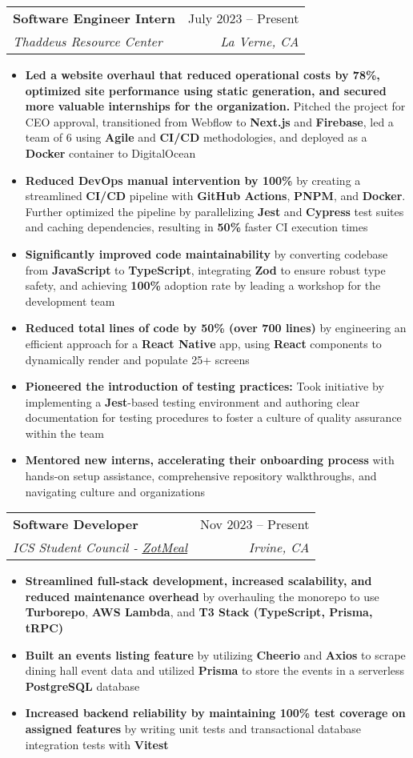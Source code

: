 \documentclass[letterpaper,11pt]{article}
\makeatletter
\newcommand{\resumeItem}[1]{
  \item\setstretch{.95}\small{
    {#1 \vspace{-2pt}}
  }
}
\newcommand{\resumeSubheading}[4]{
  \vspace{-2pt}\item
    \begin{tabular*}{0.97\textwidth}[t]{l@{\extracolsep{\fill}}r}
      \textbf{#1} & #2 \\
      \textit{\small#3} & \textit{\small #4} \\
    \end{tabular*}\vspace{-4.8pt}
}
\newcommand{\resumeItemListStart}{\begin{itemize}}
\newcommand{\resumeItemListEnd}{\end{itemize}\vspace{-5pt}}
\makeatother
\begin{document}
    \resumeSubheading
      {Software Engineer Intern}{July 2023 -- Present}
      {Thaddeus Resource Center}{La Verne, CA}
      \resumeItemListStart
        \resumeItem{\textbf{Led a website overhaul that reduced operational costs by 78\%, optimized site performance using static generation, and secured more valuable internships for the organization.} Pitched the project for CEO approval, transitioned from Webflow to \textbf{Next.js} and \textbf{Firebase}, led a team of 6 using \textbf{Agile} and \textbf{CI/CD} methodologies, and deployed as a \textbf{Docker} container to DigitalOcean}
        \resumeItem{\textbf{Reduced DevOps manual intervention by 100\%} by creating a streamlined \textbf{CI/CD} pipeline with \textbf{GitHub Actions}, \textbf{PNPM}, and \textbf{Docker}. Further optimized the pipeline by parallelizing \textbf{Jest} and \textbf{Cypress} test suites and caching dependencies, resulting in \textbf{50\%} faster CI execution times}
        \resumeItem{\textbf{Significantly improved code maintainability} by converting codebase from \textbf{JavaScript} to \textbf{TypeScript}, integrating \textbf{Zod} to ensure robust type safety, and achieving \textbf{100\%} adoption rate by leading a workshop for the development team}
        \resumeItem{\textbf{Reduced total lines of code by 50\% (over 700 lines)} by engineering an efficient approach for a \textbf{React Native} app, using \textbf{React} components to dynamically render and populate 25+ screens}
        \resumeItem{\textbf{Pioneered the introduction of testing practices:} Took initiative by implementing a \textbf{Jest}-based testing environment and authoring clear documentation for testing procedures to foster a culture of quality assurance within the team}
        \resumeItem{\textbf{Mentored new interns, accelerating their onboarding process} with hands-on setup assistance, comprehensive repository walkthroughs, and navigating culture and organizations}
      \resumeItemListEnd

      \resumeSubheading
      {Software Developer}{Nov 2023 -- Present}
      {ICS Student Council - \href{https://github.com/icssc/ZotMeal}{\uline{ZotMeal}}}{Irvine, CA}
      \resumeItemListStart
      \resumeItem{\textbf{Streamlined full-stack development, increased scalability, and reduced maintenance overhead} by overhauling the monorepo to use \textbf{Turborepo}, \textbf{AWS Lambda}, and \textbf{T3 Stack (TypeScript, Prisma, tRPC)}}
        \resumeItem{\textbf{Built an events listing feature} by utilizing \textbf{Cheerio} and \textbf{Axios} to scrape dining hall event data and utilized \textbf{Prisma} to store the events in a serverless \textbf{PostgreSQL} database}
        \resumeItem{\textbf{Increased backend reliability by maintaining 100\% test coverage on assigned features} by writing unit tests and transactional database integration tests with \textbf{Vitest}}
      \resumeItemListEnd
      
\end{document}
